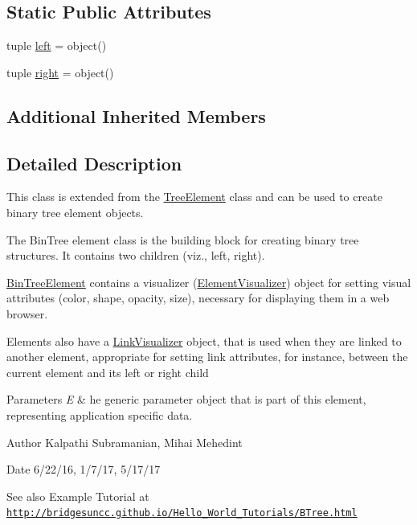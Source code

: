 \subsection*{Static Public Attributes}
\begin{DoxyCompactItemize}
\item 
tuple \hyperlink{class_bin_tree_element_1_1_bin_tree_element_aa757940232835711bd16b58e67eae9fb}{left} = object()
\item 
tuple \hyperlink{class_bin_tree_element_1_1_bin_tree_element_a96aa549e65f62466b8637ad16f1c2292}{right} = object()
\end{DoxyCompactItemize}
\subsection*{Additional Inherited Members}


\subsection{Detailed Description}
This class is extended from the \hyperlink{namespace_tree_element}{Tree\+Element} class and can be used to create binary tree element objects. 

The Bin\+Tree element class is the building block for creating binary tree structures. It contains two children (viz., left, right).

\hyperlink{class_bin_tree_element_1_1_bin_tree_element}{Bin\+Tree\+Element} contains a visualizer (\hyperlink{namespace_element_visualizer}{Element\+Visualizer}) object for setting visual attributes (color, shape, opacity, size), necessary for displaying them in a web browser.

Elements also have a \hyperlink{namespace_link_visualizer}{Link\+Visualizer} object, that is used when they are linked to another element, appropriate for setting link attributes, for instance, between the current element and its left or right child


\begin{DoxyParams}{Parameters}
{\em E} & he generic parameter object that is part of this element, representing application specific data.\\
\hline
\end{DoxyParams}
\begin{DoxyAuthor}{Author}
Kalpathi Subramanian, Mihai Mehedint
\end{DoxyAuthor}
\begin{DoxyDate}{Date}
6/22/16, 1/7/17, 5/17/17
\end{DoxyDate}
\begin{DoxySeeAlso}{See also}
Example Tutorial at ~\newline
 \href{http://bridgesuncc.github.io/Hello_World_Tutorials/BTree.html}{\tt http\+://bridgesuncc.\+github.\+io/\+Hello\+\_\+\+World\+\_\+\+Tutorials/\+B\+Tree.\+html} 
\end{DoxySeeAlso}


